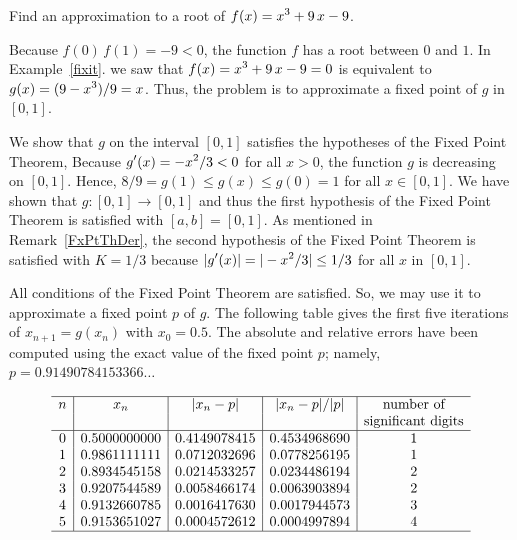 \begin{egg}
Find an approximation to a root of $\displaystyle f(x)=x^3+9\,x-9$.

Because $f(0)\,f(1)=-9<0$, the function $f$ has a root between $0$ and
$1$.  In Example~\ref{fixit}. we saw that $\displaystyle f(x)=x^3+9\,x-9=0$ is
equivalent to $\displaystyle g(x)=(9-x^3)/9 =x$.  Thus, the problem is to
approximate a fixed point of $g$ in $[0,1]$.

We show that $g$ on the interval $[0,1]$ satisfies the hypotheses of
the Fixed Point Theorem,  Because
$\displaystyle g'(x) = -x^2/3 < 0$ for all $x>0$,
the function $g$ is decreasing on $[0,1]$.  Hence,
$8/9 =g(1) \leq g(x) \leq g(0) = 1$ for all $x \in [0,1]$.  We have
shown that $g:[0,1]\rightarrow [0,1]$ and thus the first hypothesis of
the Fixed Point Theorem is satisfied with $[a,b]=[0,1]$.  As mentioned
in Remark~\ref{FxPtThDer}, the second hypothesis of the Fixed Point
Theorem is satisfied with $K=1/3$ because
$\displaystyle |g'(x)|=|-x^2/3|\leq1/3$ for all $x$ in $[0,1]$.

All conditions of the Fixed Point Theorem are satisfied.  So, we
may use it to approximate a fixed point $p$ of $g$.  The following table
gives the first five iterations of $x_{n+1} = g(x_n)$ with
$x_0=0.5$.  The absolute and relative errors have been computed using
the exact value of the fixed point $p$; namely,
$p=0.91490784153366\ldots$

\[
\begin{array}{c|c|c|c|c}
\hline
n & x_n & |x_n-p| & |x_n-p|/|p| & \text{number of} \\
 & & & & \text{significant digits} \\
\hline
0 & 0.5000000000 & 0.4149078415 & 0.4534968690 & 1 \\
1 & 0.9861111111 & 0.0712032696 & 0.0778256195 & 1 \\
2 & 0.8934545158 & 0.0214533257 & 0.0234486194 & 2 \\
3 & 0.9207544589 & 0.0058466174 & 0.0063903894 & 2 \\
4 & 0.9132660785 & 0.0016417630 & 0.0017944573 & 3 \\
5 & 0.9153651027 & 0.0004572612 & 0.0004997894 & 4 \\
\hline
\end{array}
\]
\end{egg}

